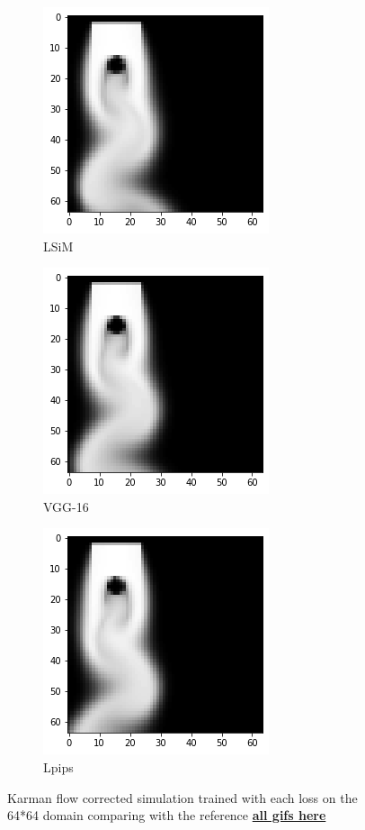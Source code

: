 \documentclass[a4paper,12pt,twoside]{report}
\begin{document}
\begin{figure}
	\begin{subfigure}{0.32\textwidth}
		\centering
		\includegraphics[scale=0.5]{karman_low/lsim}
		\caption{LSiM}
	\end{subfigure}
	\begin{subfigure}{0.32\textwidth}
		\centering
		\includegraphics[scale=0.5]{karman_low/vgg}
		\caption{VGG-16}
	\end{subfigure}
	\begin{subfigure}{0.32\textwidth}
		\centering
		\includegraphics[scale=0.5]{karman_low/lpips}
		\caption{Lpips}
	\end{subfigure}
	\caption{Karman flow corrected simulation trained with each loss on the 64*64 domain comparing with the reference \href{https://github.com/w191444052/sol-data/tree/master/karman_low}{\bf{all gifs here}}}
	\label{sol karman low}
\end{figure}
\end{document}
